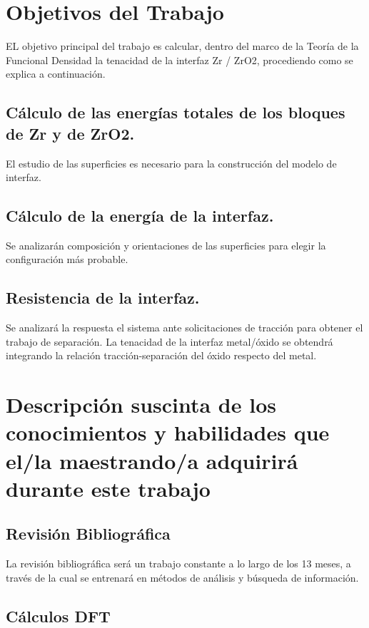\section{Objetivos del Trabajo}

EL objetivo principal del trabajo es calcular, dentro del marco de la Teoría de 
la Funcional Densidad la tenacidad de la interfaz Zr / ZrO2, procediendo como
se explica a continuación.

\subsection{ Cálculo de las energías totales de los bloques de Zr y de ZrO2.}

El estudio de las superficies es necesario para la construcción del modelo de 
interfaz.

\subsection{ Cálculo de la energía de la interfaz.}

Se analizarán composición y orientaciones de las superficies para elegir la 
configuración más probable.

\subsection{Resistencia de la interfaz.}

 Se analizará la respuesta el sistema ante solicitaciones de tracción para 
obtener el trabajo de separación. La tenacidad de la interfaz metal/óxido se 
obtendrá integrando la relación tracción-separación del óxido respecto del 
metal.

\section{Descripción suscinta de los conocimientos y habilidades que el/la  
maestrando/a adquirirá durante este trabajo }

\subsection{ Revisión Bibliográfica}

La revisión bibliográfica será un trabajo constante a lo largo de los 13 meses, 
a través de la cual se entrenará en métodos de análisis y búsqueda de 
información.

\subsection{ Cálculos DFT}

